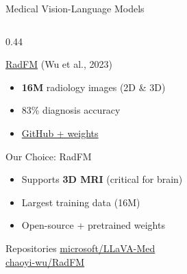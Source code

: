 \documentclass[aspectratio=169,xcolor=dvipsnames]{beamer}
\begin{document}
\begin{frame}{Medical Vision-Language Models}
\begin{columns}
        \begin{column}{0.44\textwidth}
            \begin{block}{\href{https://arxiv.org/abs/2308.02463}{RadFM} (Wu et al., 2023)}
                \small
                \begin{itemize}\setlength{\itemsep}{1pt}
                    \item \textbf{16M} radiology images (2D \& 3D)
                    \item 83\% diagnosis accuracy
                    \item \textcolor{green}{} \href{https://github.com/chaoyi-wu/RadFM}{GitHub + weights}
                \end{itemize}
            \end{block}
            
            \begin{alertblock}{ Our Choice: RadFM}
                \small
                \begin{itemize}\setlength{\itemsep}{1pt}
                    \item Supports \textbf{3D MRI} (critical for brain)
                    \item Largest training data (16M)
                    \item Open-source + pretrained weights
                \end{itemize}
            \end{alertblock}
            
            \begin{exampleblock}{ Repositories}
                \scriptsize
                \href{https://github.com/microsoft/LLaVA-Med}{microsoft/LLaVA-Med}\\
                \href{https://github.com/chaoyi-wu/RadFM}{chaoyi-wu/RadFM}
            \end{exampleblock}
        \end{column}
    \end{columns}
\end{frame}
\end{document}

